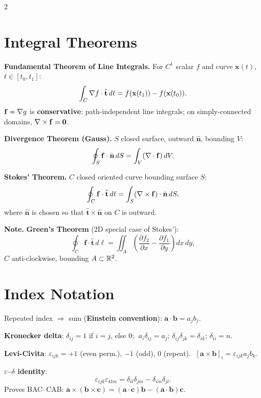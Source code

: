 \documentclass[10pt,a4paper]{article}
\newcommand{\kw}[1]{\textbf{#1}}
\newcommand{\p}[2]{\frac{\partial #1}{\partial #2}}      %
\newcommand{\hvt}{\hat{\mathbf{t}}}
\newcommand{\hvn}{\hat{\mathbf{n}}}
\newcommand{\vx}{\mathbf{x}}
\newcommand{\vf}{\mathbf{f}}
\begin{document}
\begin{multicols}{2}
\section{Integral Theorems}

\begin{defbox}
\textbf{Fundamental Theorem of Line Integrals.}
For $C^1$ scalar $f$ and curve $\vx(t)$, $t\in[t_0,t_1]$:
\[
  \int_C \bnabla f\cdot\hvt\,d\ell
  = f(\vx(t_1))-f(\vx(t_0)).
\]
$\vf=\bnabla g$ is \kw{conservative}: path-independent line integrals;
on simply-connected domains, $\bnabla\times\vf=\mathbf{0}$.

\medskip
\textbf{Divergence Theorem (Gauss).}
$S$ closed surface, outward $\hvn$, bounding $V$:
\[
  \oint_S \vf\cdot\hvn\,dS = \int_V(\bnabla\cdot\vf)\,dV.
\]

\textbf{Stokes' Theorem.}
$C$ closed oriented curve bounding surface $S$:
\[
  \oint_C \vf\cdot\hvt\,d\ell
  = \int_S(\bnabla\times\vf)\cdot\hvn\,dS,
\]
where $\hvn$ is chosen so that $\hvt\times\hvn$ on $C$ is outward.
\end{defbox}

\begin{exbox}
\par\textbf{\color{exframe}Note.\space}
\textbf{Green's Theorem} (2D special case of Stokes'):
\[
  \oint_C \vf\cdot\hvt\,d\ell
  = \iint_A\!\left(\p{f_2}{x}-\p{f_1}{y}\right)dx\,dy,
\]
$C$ anti-clockwise, bounding $A\subset\mathbb{R}^2$.
\end{exbox}

\section{Index Notation}

\begin{defbox}
Repeated index $\Rightarrow$ sum (\kw{Einstein convention}):
$\mathbf{a}\cdot\mathbf{b}=a_jb_j$.

\kw{Kronecker delta}: $\delta_{ij}=1$ if $i=j$, else $0$;
$\;a_i\delta_{ij}=a_j$;\;
$\delta_{ij}\delta_{jk}=\delta_{ik}$;\;
$\delta_{ii}=n$.

\kw{Levi-Civita}: $\varepsilon_{ijk}=+1$ (even perm.), $-1$ (odd), $0$ (repeat).
$\;[\mathbf{a}\times\mathbf{b}]_i=\varepsilon_{ijk}a_jb_k$.

\kw{$\varepsilon$--$\delta$ identity}:
\[
  \varepsilon_{ijk}\varepsilon_{klm}
  = \delta_{il}\delta_{jm}-\delta_{im}\delta_{jl}.
\]
Proves BAC--CAB:
$\mathbf{a}\times(\mathbf{b}\times\mathbf{c})
 =(\mathbf{a}\cdot\mathbf{c})\mathbf{b}-(\mathbf{a}\cdot\mathbf{b})\mathbf{c}$.


\end{defbox}
\end{multicols}
\end{document}
